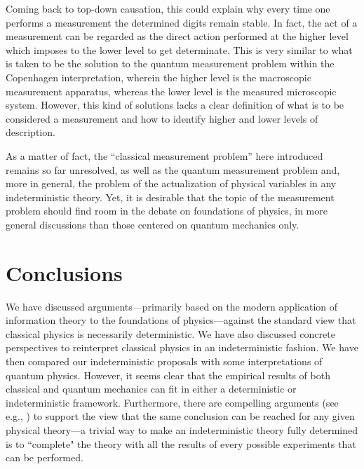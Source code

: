 \documentclass[12pt]{article}
\begin{document}
Coming back to top-down causation, this could explain why every time one performs a measurement the determined digits remain stable. In fact, the act of a measurement can be regarded as the direct action performed at the higher level which imposes to the lower level to get  determinate. This is very similar to what is taken to be the solution to the quantum measurement problem within the Copenhagen interpretation, wherein the higher level is the macroscopic measurement apparatus, whereas the lower level is the measured microscopic system. However, this kind of solutions lacks a clear definition of what is to be considered a measurement and how to identify higher and lower levels of description.


As a matter of fact, the ``classical measurement problem'' here introduced remains so far unresolved, as well as the quantum measurement problem and, more in general, the problem of the actualization of physical variables in any indeterministic theory. Yet, it is desirable that the topic of the measurement problem should find room in the debate on foundations of physics, in more general discussions than those centered on quantum mechanics only.


\section{Conclusions}

We have discussed arguments---primarily based on the modern application of information theory to the foundations of physics---against the standard view that classical physics is necessarily deterministic. We have also discussed concrete perspectives to reinterpret classical physics in an indeterministic fashion. We have then compared our indeterministic proposals with some interpretations of quantum physics. However, it seems clear that the empirical results of both classical and quantum mechanics can fit in either a deterministic or indeterministic framework. Furthermore, there are compelling arguments (see e.g., \cite{gisin1, suppes, wendl}) to support the view that the same conclusion can be reached for any given physical theory---a trivial way to make an indeterministic theory fully determined is to ``complete" the theory with all the results of every possible experiments that can be performed.
\end{document}
